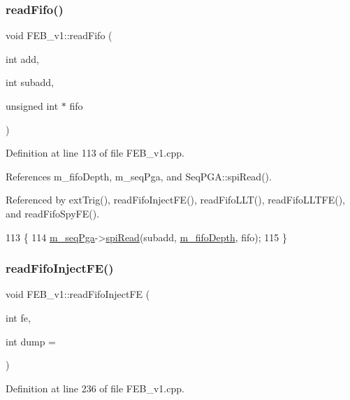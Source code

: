 \subsubsection{\texorpdfstring{read\+Fifo()}{readFifo()}}
{\footnotesize\ttfamily void F\+E\+B\+\_\+v1\+::read\+Fifo (\begin{DoxyParamCaption}\item[{int}]{add,  }\item[{int}]{subadd,  }\item[{unsigned int $\ast$}]{fifo }\end{DoxyParamCaption})}



Definition at line 113 of file F\+E\+B\+\_\+v1.\+cpp.



References m\+\_\+fifo\+Depth, m\+\_\+seq\+Pga, and Seq\+P\+G\+A\+::spi\+Read().



Referenced by ext\+Trig(), read\+Fifo\+Inject\+F\+E(), read\+Fifo\+L\+L\+T(), read\+Fifo\+L\+L\+T\+F\+E(), and read\+Fifo\+Spy\+F\+E().


\begin{DoxyCode}
113                                                               \{
114   \hyperlink{classFEB__v1_a6c7804ac86796f233a8393043adf2e77}{m\_seqPga}->\hyperlink{classSeqPGA_ab3d0e5e5d4014bc7a92588a76b8713d4}{spiRead}(subadd, \hyperlink{classFEB__v1_a30473bcdd8f018ad5dac728f6779df9c}{m\_fifoDepth}, fifo);
115 \}
\end{DoxyCode}
\mbox{\label{classFEB__v1_ab370d9f02895e1a44ab19d320255123e}} 
\subsubsection{\texorpdfstring{read\+Fifo\+Inject\+F\+E()}{readFifoInjectFE()}}
{\footnotesize\ttfamily void F\+E\+B\+\_\+v1\+::read\+Fifo\+Inject\+FE (\begin{DoxyParamCaption}\item[{int}]{fe,  }\item[{int}]{dump = {} }\end{DoxyParamCaption})}



Definition at line 236 of file F\+E\+B\+\_\+v1.\+cpp.



